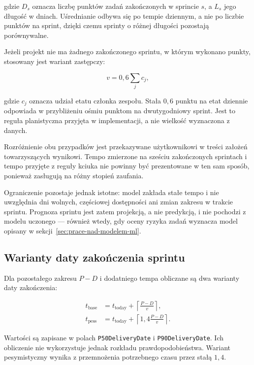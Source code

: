 gdzie \(D_s\) oznacza liczbę punktów zadań zakończonych w sprincie \(s\), a \(L_s\) jego długość w dniach. Uśrednianie odbywa się po tempie dziennym, a nie po liczbie punktów na sprint, dzięki czemu sprinty o różnej długości pozostają porównywalne.

Jeżeli projekt nie ma żadnego zakończonego sprintu, w którym wykonano punkty, stosowany jest wariant zastępczy:

\begin{equation}
    v = 0{,}6 \sum_{j} c_j,
    \label{eq:velocity-zalozone}
\end{equation}

gdzie \(c_j\) oznacza udział etatu członka zespołu. Stała \(0{,}6\) punktu na etat dziennie odpowiada w przybliżeniu ośmiu punktom na dwutygodniowy sprint. Jest to reguła planistyczna przyjęta w implementacji, a nie wielkość wyznaczona z danych.

Rozróżnienie obu przypadków jest przekazywane użytkownikowi w treści założeń towarzyszących wynikowi. Tempo zmierzone na sześciu zakończonych sprintach i tempo przyjęte z reguły kciuka nie powinny być prezentowane w ten sam sposób, ponieważ zasługują na różny stopień zaufania.

Ograniczenie pozostaje jednak istotne: model zakłada stałe tempo i nie uwzględnia dni wolnych, częściowej dostępności ani zmian zakresu w trakcie sprintu. Prognoza sprintu jest zatem projekcją, a nie predykcją, i nie pochodzi z modelu uczonego — również wtedy, gdy oceny ryzyka zadań wyznacza model opisany w sekcji~\ref{sec:prace-nad-modelem-ml}.

\subsection{Warianty daty zakończenia sprintu}

Dla pozostałego zakresu \(P-D\) i dodatniego tempa obliczane są dwa warianty daty zakończenia:

\begin{align}
    t_{\mathrm{base}}
    &= t_{\mathrm{today}}
    + \left\lceil \frac{P-D}{v} \right\rceil,\\
    t_{\mathrm{pess}}
    &= t_{\mathrm{today}}
    + \left\lceil 1{,}4\frac{P-D}{v} \right\rceil.
    \label{eq:sprint-daty}
\end{align}

Wartości są zapisane w polach \texttt{P50DeliveryDate} i \texttt{P90DeliveryDate}. Ich obliczenie nie wykorzystuje jednak rozkładu prawdopodobieństwa. Wariant pesymistyczny wynika z przemnożenia potrzebnego czasu przez stałą \(1{,}4\).

